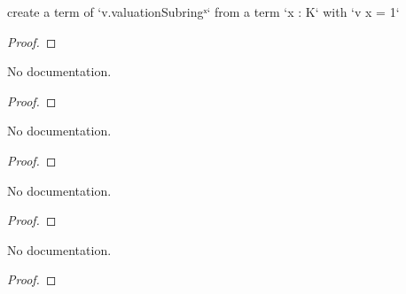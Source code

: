 \begin{theorem}\label{Valuation.UnitOfValOne_elem}
        \leanok
                create a term of `v.valuationSubringˣ` from a term `x : K` with `v x = 1`
    \end{theorem}

\begin{proof}
    \leanok
\end{proof}

\begin{theorem}\label{Valuation.val_UnitOfValOne_eq_one}
        \leanok
                No documentation.
    \end{theorem}

\begin{proof}
    \leanok
\end{proof}

\begin{theorem}\label{DiscreteValuation.pow_Uniformizer_all}
        \leanok
                No documentation.
    \end{theorem}

\begin{proof}
    \leanok
\end{proof}

\begin{theorem}\label{DiscreteValuation.pow_Uniformizer'}
        \leanok
                No documentation.
    \end{theorem}

\begin{proof}
    \leanok
\end{proof}

\begin{theorem}\label{DiscreteValuation.val_pow_Uniformizer}
        \leanok
                No documentation.
    \end{theorem}

\begin{proof}
    \leanok
\end{proof}

